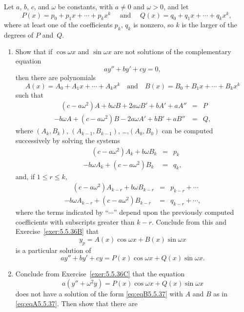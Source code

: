 \documentclass{ximera}
\begin{document}
\begin{problem}\label{exer:5.5.37}
Let $a$, $b$, $c$, and $\omega$ be constants, with $a\ne0$ and
$\omega>0$, and let
$$
P(x)=p_0+p_1x+\cdots+p_kx^k \quad \text{ and }\quad
Q(x)=q_0+q_1x+\cdots+q_kx^k,
$$
where at least one of the coefficients $p_k$, $q_k$ is nonzero, so
 $k$  is the larger of the degrees of $P$ and~$Q$.
\begin{enumerate}
\item %
Show that if $\cos\omega x$ and $\sin\omega x$
are not solutions of the complementary equation
$$
ay''+by'+cy=0,
$$
then  there are polynomials
\begin{equation}\label{eq:eqA5.5.37}
A(x)=A_0+A_1x+\cdots+A_kx^k \quad  \text{and}\quad
B(x)=B_0+B_1x+\cdots+B_kx^k
\end{equation}
such that
$$
\begin{array}{lcl}
\quad (c-a\omega^2)A+b\omega B+2a\omega
B'+bA'+aA''&=&P\phantom{.}\\ 
-b\omega A+(c-a\omega^2)B-2a\omega A'+bB'+aB''&=&Q,
\end{array}
$$
where $(A_k,B_k)$, $(A_{k-1},B_{k-1})$, \dots,$(A_0,B_0)$ can be computed
successively by solving the systems
$$
\begin{array}{lcl}
\phantom{-}(c-a\omega^2)A_k+b\omega B_k&=&p_k\phantom{.}\\ 
-b\omega A_k+(c-a\omega^2)B_k&=&q_k,
\end{array}
$$
and, if $1\le r\le k$,
$$
\begin{array}{lcl}
\phantom{-}(c-a\omega^2)A_{k-r}+b\omega
B_{k-r}&=&p_{k-r}+\cdots\phantom{.}\\ 
-b\omega A_{k-r}+(c-a\omega^2)B_{k-r}&=&q_{k-r}+\cdots,
\end{array}
$$
where the terms indicated by ``$\cdots$'' depend upon the previously
computed coefficients with subscripts greater than $k-r$.
Conclude from this and Exercise~\ref{exer:5.5.36B} that
\begin{equation}\label{eq:eqB5.5.37}
y_p=A(x)\cos\omega x+B(x)\sin\omega x
\end{equation}
is a particular solution of
$$
ay''+by'+cy=P(x)\cos\omega x+Q(x)\sin\omega x.
$$
\item %
Conclude from Exercise~\ref{exer:5.5.36C}
 that the equation
\begin{equation}\label{eq:eqC5.5.37}
a(y''+\omega^2 y)=P(x)\cos\omega x+Q(x)\sin\omega x
\end{equation}
does not have a solution of the form \ref{eq:eqB5.5.37} with  $A$
and $B$ as in \ref{eq:eqA5.5.37}. Then show that there are

\end{enumerate}
\end{problem}
\end{document}
